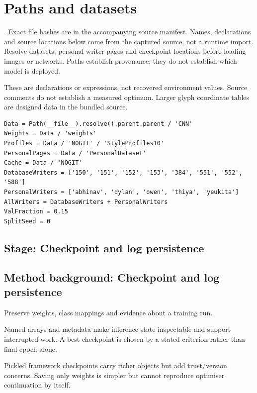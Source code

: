 \chapter{Paths and datasets}\label{module:paths}
. Exact file hashes are in the accompanying source manifest. Names, declarations and source locations below come from the captured source, not a runtime import.
Resolve datasets, personal writer pages and checkpoint locations before loading images or networks. Paths establish provenance; they do not establish which model is deployed.


These are declarations or expressions, not recovered environment values. Source comments do not establish a measured optimum. Larger glyph coordinate tables are designed data in the bundled source.
\begin{lstlisting}[style=plain]
Data = Path(__file__).resolve().parent.parent / 'CNN'
Weights = Data / 'weights'
Profiles = Data / 'NOGIT' / 'StyleProfiles10'
PersonalPages = Data / 'PersonalDataset'
Cache = Data / 'NOGIT'
DatabaseWriters = ['150', '151', '152', '153', '384', '551', '552', '588']
PersonalWriters = ['abhinav', 'dylan', 'owen', 'thiya', 'yeukita']
AllWriters = DatabaseWriters + PersonalWriters
ValFraction = 0.15
SplitSeed = 0
\end{lstlisting}
\section*{Stage: Checkpoint and log persistence}
\section{Method background: Checkpoint and log persistence}\label{method:checkpoint}
Preserve weights, class mappings and evidence about a training run.


Named arrays and metadata make inference state inspectable and support interrupted work. A best checkpoint is chosen by a stated criterion rather than final epoch alone.


Pickled framework checkpoints carry richer objects but add trust/version concerns. Saving only weights is simpler but cannot reproduce optimiser continuation by itself.


